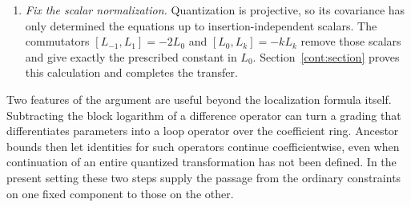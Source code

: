 \begin{enumerate}
\item \emph{Fix the scalar normalization.}
Quantization is projective, so its covariance has only
determined the equations up to insertion-independent
scalars. The commutators
$[L_{-1},L_1]=-2L_0$ and $[L_0,L_k]=-kL_k$
remove those scalars and give exactly the prescribed
constant in $L_0$. Section~\ref{cont:section} proves
this calculation and completes the transfer.
\end{enumerate}

Two features of the argument are useful beyond the
localization formula itself. Subtracting the block logarithm
of a difference operator can turn a grading that
differentiates parameters into a loop operator over the
coefficient ring. Ancestor bounds then let identities for
such operators continue coefficientwise, even when
continuation of an entire quantized transformation has
not been defined. In the present setting these two steps
supply the passage from the ordinary constraints on one
fixed component to those on the other.
